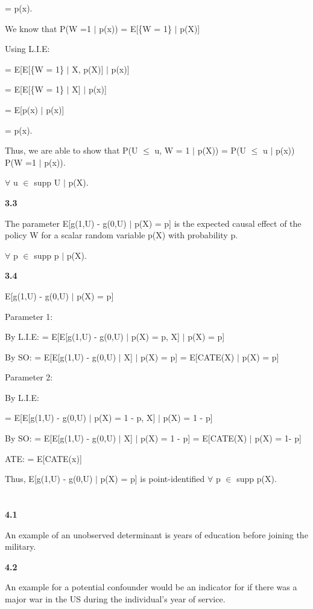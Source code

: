 \documentclass{article}
\begin{document}
= p(x).

We know that P(W =1 $\mid$ p(x)) = E[\{W = 1\} $\mid$ p(X)]

Using L.I.E:

= E[E[\{W = 1\} $\mid$ X, p(X)] $\mid$ p(x)]

= E[E[\{W = 1\} $\mid$ X] $\mid$ p(x)]

= E[p(x) $\mid$ p(x)]

= p(x).

Thus, we are able to show that P(U $\leq$ u, W = 1 $\mid$ p(X)) = P(U $\leq$ u $\mid$ p(x)) P(W =1 $\mid$ p(x)).

$\forall$ u $\in$ supp U $\mid$ p(X).

\textbf{3.3}

The parameter E[g(1,U) - g(0,U) $\mid$ p(X) = p] is the expected causal effect of the policy W for a scalar random variable p(X) with probability p.

$\forall$ p $\in$ supp p $\mid$ p(X).

\textbf{3.4}

E[g(1,U) - g(0,U) $\mid$ p(X) = p]

Parameter 1:

By L.I.E:
= E[E[g(1,U) - g(0,U) $\mid$ p(X) = p, X] $\mid$ p(X) = p]

By SO: = E[E[g(1,U) - g(0,U) $\mid$ X] $\mid$ p(X) = p] = E[CATE(X) $\mid$ p(X) = p]

Parameter 2:

By L.I.E:

= E[E[g(1,U) - g(0,U) $\mid$ p(X) = 1 - p, X] $\mid$ p(X) = 1 - p]

By SO: = E[E[g(1,U) - g(0,U) $\mid$ X] $\mid$ p(X) = 1 - p] = E[CATE(X) $\mid$ p(X) = 1- p]

ATE: = E[CATE(x)]

Thus, E[g(1,U) - g(0,U) $\mid$ p(X) = p] is point-identified $\forall$ p $\in$ supp p(X).

\section{}

\textbf{4.1}

An example of an unobserved determinant is years of education before joining the military.

\textbf{4.2}

An example for a potential confounder would be an indicator for if there was a major war in the US during the individual's year of service.
\end{document}
